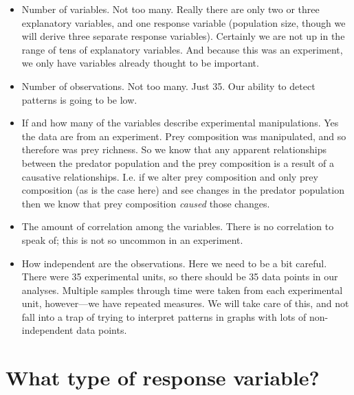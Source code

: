 \documentclass[]{book}
\providecommand{\tightlist}{%
  \setlength{\itemsep}{0pt}\setlength{\parskip}{0pt}}
\begin{document}
\begin{itemize}
\tightlist
\item
  Number of variables. Not too many. Really there are only two or three explanatory variables, and one response variable (population size, though we will derive three separate response variables). Certainly we are not up in the range of tens of explanatory variables. And because this was an experiment, we only have variables already thought to be important.
\item
  Number of observations. Not too many. Just 35. Our ability to detect patterns is going to be low.
\item
  If and how many of the variables describe experimental manipulations. Yes the data are from an experiment. Prey composition was manipulated, and so therefore was prey richness. So we know that any apparent relationships between the predator population and the prey composition is a result of a causative relationships. I.e. if we alter prey composition and only prey composition (as is the case here) and see changes in the predator population then we know that prey composition \emph{caused} those changes.
\item
  The amount of correlation among the variables. There is no correlation to speak of; this is not so uncommon in an experiment.
\item
  How independent are the observations. Here we need to be a bit careful. There were 35 experimental units, so there should be 35 data points in our analyses. Multiple samples through time were taken from each experimental unit, however---we have repeated measures. We will take care of this, and not fall into a trap of trying to interpret patterns in graphs with lots of non-independent data points.
\end{itemize}

\hypertarget{what-type-of-response-variable}{%
\section{What type of response variable?}\label{what-type-of-response-variable}}
\end{document}
